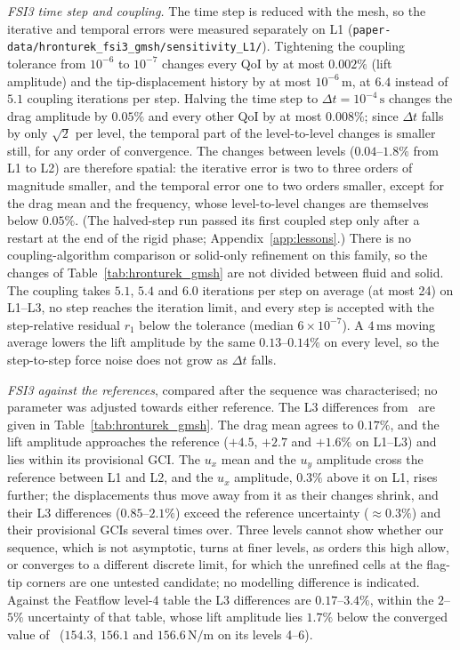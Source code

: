 \emph{FSI3 time step and coupling.}
The time step is reduced with the mesh, so the iterative and temporal errors were measured separately on L1 (\texttt{paper-data/hronturek\_fsi3\_gmsh/sensitivity\_L1/}). Tightening the coupling tolerance from $10^{-6}$ to $10^{-7}$ changes every QoI by at most $0.002\%$ (lift amplitude) and the tip-displacement history by at most $10^{-6}\,\mathrm{m}$, at $6.4$ instead of $5.1$ coupling iterations per step. Halving the time step to $\Delta t = 10^{-4}\,\mathrm{s}$ changes the drag amplitude by $0.05\%$ and every other QoI by at most $0.008\%$; since $\Delta t$ falls by only $\sqrt{2}$ per level, the temporal part of the level-to-level changes is smaller still, for any order of convergence. The changes between levels ($0.04$--$1.8\%$ from L1 to L2) are therefore spatial: the iterative error is two to three orders of magnitude smaller, and the temporal error one to two orders smaller, except for the drag mean and the frequency, whose level-to-level changes are themselves below $0.05\%$. (The halved-step run passed its first coupled step only after a restart at the end of the rigid phase; Appendix~\ref{app:lessons}.) There is no coupling-algorithm comparison or solid-only refinement on this family, so the changes of Table~\ref{tab:hronturek_gmsh} are not divided between fluid and solid. The coupling takes $5.1$, $5.4$ and $6.0$ iterations per step on average (at most 24) on L1--L3, no step reaches the iteration limit, and every step is accepted with the step-relative residual $r_1$ below the tolerance (median $6\times10^{-7}$). A $4\,\mathrm{ms}$ moving average lowers the lift amplitude by the same $0.13$--$0.14\%$ on every level, so the step-to-step force noise does not grow as $\Delta t$ falls.

\emph{FSI3 against the references}, compared after the sequence was characterised; no parameter was adjusted towards either reference.
The L3 differences from~\citet{Failer2020} are given in Table~\ref{tab:hronturek_gmsh}. The drag mean agrees to $0.17\%$, and the lift amplitude approaches the reference ($+4.5$, $+2.7$ and $+1.6\%$ on L1--L3) and lies within its provisional GCI. The $u_x$ mean and the $u_y$ amplitude cross the reference between L1 and L2, and the $u_x$ amplitude, $0.3\%$ above it on L1, rises further; the displacements thus move away from it as their changes shrink, and their L3 differences ($0.85$--$2.1\%$) exceed the reference uncertainty ($\approx0.3\%$) and their provisional GCIs several times over. Three levels cannot show whether our sequence, which is not asymptotic, turns at finer levels, as orders this high allow, or converges to a different discrete limit, for which the unrefined cells at the flag-tip corners are one untested candidate; no modelling difference is indicated.
Against the Featflow level-4 table the L3 differences are $0.17$--$3.4\%$, within the $2$--$5\%$ uncertainty of that table, whose lift amplitude lies $1.7\%$ below the converged value of~\citet{Failer2020} ($154.3$, $156.1$ and $156.6\,\mathrm{N/m}$ on its levels 4--6).

